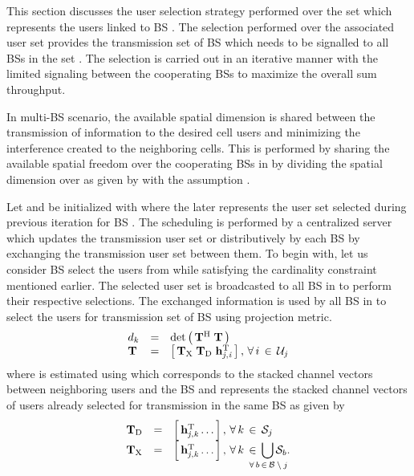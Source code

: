 
This section discusses the user selection strategy performed over the set  which represents the users linked to BS . The selection performed over the associated user set  provides the transmission set  of BS  which needs to be signalled to all BSs in the set . The selection is carried out in an iterative manner with the limited signaling between the cooperating BSs to maximize the overall sum throughput.

In multi-BS scenario, the available spatial dimension  is shared between the transmission of information to the desired cell users and minimizing the interference created to the neighboring cells. This is performed by sharing the available spatial freedom  over the cooperating BSs in  by dividing the spatial dimension over  as given by  with the assumption .

Let  and  be initialized with  where the later represents the user set selected during previous iteration for BS . The scheduling is performed by a centralized server which updates the transmission user set or distributively by each BS by exchanging the transmission user set  between them. To begin with, let us consider BS  select the users from  while satisfying the cardinality constraint mentioned earlier. The selected user set  is broadcasted to all BS in  to perform their respective selections. The exchanged information  is used by all BS in  to select the users for transmission set  of BS  using projection metric.
\begin{equation}
\begin{array}{lcl}
d_k &=& \det \left ( \, \mathbf{T}^{\mathrm{H}} \; \mathbf{T} \, \right ) \\
\mathbf{T} &=& \left [ \, \mathbf{T}_{\mathrm{X}} \; \mathbf{T}_{\mathrm{D}} \; \mathbf{h}_{\mathit{j},\mathit{i}}^{\mathrm{T}} \, \right ], \, \forall \, i \, \in \, \mathcal{U}_j
\end{array}
\label{sus-e1}
\end{equation}
where  is estimated using  which corresponds to the stacked channel vectors between neighboring users and the BS  and  represents the stacked channel vectors of users already selected for transmission in the same BS  as given by
\begin{equation}
\begin{array}{lcl}
\mbf{T}_{\mrm{D}} &=& \matscont{\mvecxyz{h}{j}{k}^\mrm{T} \dotso}, \fall k \inm \mc{S}_j \\
\mbf{T}_{\mrm{X}} &=& \matscont{\mvecxyz{h}{j}{k}^\mrm{T} \dotso }, \fall k \inm \displaystyle \bigcup_{\mathclap{\fall b \inm \mc{B} \bs j}} \mc{S}_b.
\end{array}
\label{sus-e2}
\end{equation}

